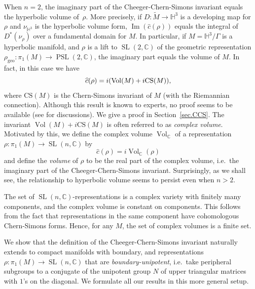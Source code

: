 \documentclass[11pt]{amsart}
\theoremstyle{definition}
\numberwithin{equation}{section}
\def\printname#1{
        \if\draft y
                \smash{\makebox[0pt]{\hspace{-0.5in}
                        \raisebox{8pt}{\tt\tiny #1}}}
        \fi
}
\def\lbl#1{\label{#1}\printname{#1}}
\DeclareMathOperator{\Vol}{Vol}
\DeclareMathOperator{\CS}{CS}
\DeclareMathOperator{\Imag}{Im}
\DeclareMathOperator{\SL}{SL}
\DeclareMathOperator{\PSL}{PSL}
\DeclareMathOperator{\geo}{geo}
\newcommand{\C}{\mathbb C}
\renewcommand{\H}{\mathbb H}
\def\CS{\mathrm{CS}}
\begin{document}
When $n=2$, the imaginary part of the Cheeger-Chern-Simons invariant equals 
the hyperbolic volume of~$\rho$. More precisely, if 
$D\colon\widetilde M\to\H^3$ is a developing map for $\rho$ and $\nu_{\H^3}$ 
is the hyperbolic volume form, $\Imag(\widehat c(\rho))$ equals the integral 
of $D^*(\nu_{\rho})$ over a fundamental domain for $M$. In particular, if 
$M=\H^3/\Gamma$ is a hyperbolic manifold, and $\rho$ is a lift to 
$\SL(2,\C)$ of 
the geometric representation $\rho_{\geo}\colon\pi_1(M)\to\PSL(2,\C)$, the 
imaginary part equals the volume of $M$.
In fact, in this case we have
\begin{equation}
\lbl{CCSeqVolC}
\widehat c(\rho)=i(\Vol(M)+i\CS(M)),
\end{equation}
where $\CS(M)$ is the Chern-Simons invariant of $M$ (with the Riemannian 
connection). Although this result is known to experts, no proof seems to be 
available (see \cite{Snapdescription,Neumann} for discussions). We give a 
proof in Section~\ref{sec.CCS}.
The invariant $\Vol(M)+i\CS(M)$ is often referred to as \emph{complex volume}. 
Motivated by this, we define the complex volume $\Vol_\C$ of a representation 
$\rho\colon\pi_1(M)\to\SL(n,\C)$ by
\begin{equation}
\widehat c(\rho)=i\Vol_\C(\rho)
\end{equation} 
and define the \emph{volume} of $\rho$ to be the real part of the complex 
volume, i.e.~the imaginary part of the Cheeger-Chern-Simons invariant. 
Surprisingly, as we shall see, the relationship to hyperbolic volume seems 
to persist even when $n>2$.

The set of $\SL(n,\C)$-representations is a complex variety with finitely 
many components, and the complex volume is constant on components. This 
follows from the fact that representations in the same component have 
cohomologous Chern-Simons forms.
Hence, for any $M$, the set of complex volumes is a finite set.

We show that the definition of the Cheeger-Chern-Simons invariant naturally 
extends to compact manifolds with boundary, and representations 
$\rho\colon \pi_1(M)\to\SL(n,\C)$ that are \emph{boundary-unipotent}, 
i.e.~take peripheral subgroups to a conjugate of the unipotent group $N$ 
of upper triangular matrices with $1$'s on the diagonal. We formulate all 
our results in this more general setup.
\end{document}
